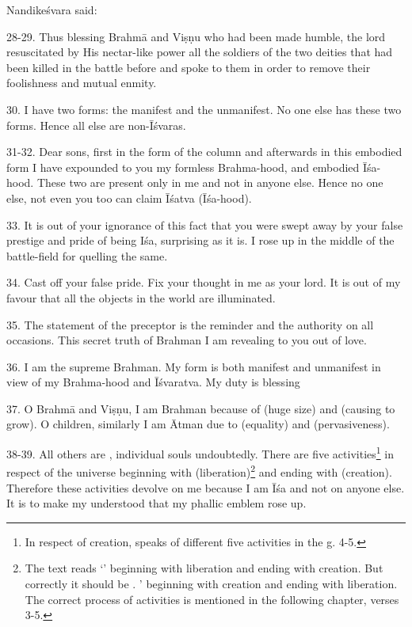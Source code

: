Nandikeśvara said:

28-29. Thus blessing Brahmā and Viṣṇu who had been made humble, the lord
resuscitated by His nectar-like power all the soldiers of the two deities that
had been killed in the battle before and spoke to them in order to remove their
foolishness and mutual enmity.

30. I have two forms: the manifest and the unmanifest. No one else has these two
forms. Hence all else are non-Īśvaras.

31-32. Dear sons, first in the form of the column and afterwards in this
embodied form I have expounded to you my formless Brahma-hood, and embodied
Īśa-hood. These two are present only in me and not in anyone else. Hence no one
else, not even you too can claim Īśatva (Īśa-hood).

33. It is out of your ignorance of this fact that you were swept away by your
false prestige and pride of being Iśa, surprising as it is. I rose up in
the middle of the battle-field for quelling the same.

34. Cast off your false pride. Fix your thought in me as your lord. It is out of
my favour that all the objects in the world are illuminated.

35. The statement of the preceptor is the reminder and the authority on all
occasions. This secret truth of Brahman I am revealing to you out of love.

36. I am the supreme Brahman. My form is both manifest and unmanifest in view of
my Brahma-hood and Īśvaratva. My duty is blessing \etc

37. O Brahmā and Viṣṇu, I am Brahman because of  (huge size) and
 (causing to grow). O children, similarly I am Ātman due to
 (equality) and  (pervasiveness).

38-39. All others are , individual souls undoubtedly. There are
five activities\footnote{In respect of creation,  speaks of
different five activities in the  g. 4-5.} in respect of
the universe beginning with  (liberation)\footnote{The text reads
‘’ \ie beginning with liberation and ending with
creation. But correctly it should be . ’ \ie
beginning with creation and ending with liberation. The correct process of
activities is mentioned in the following chapter, verses 3-5.} and ending with
 (creation). Therefore these activities devolve on me because I am
Īśa and not on anyone else. It is to make my  understood that my
phallic emblem rose up.

